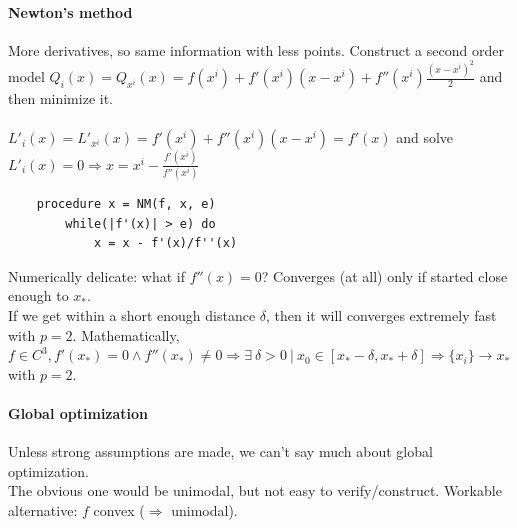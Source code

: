 \documentclass[10pt]{report}
\begin{document}
\paragraph{Newton's method} More derivatives, so same information with less points. Construct a second order model $Q_i(x) = Q_{x^i}(x) = f(x^i) + f'(x^i)(x - x^i) + f''(x^i)\frac{(x - x^i)^2}{2}$ and then minimize it.\\\\
$L'_i(x) = L'_{x^i}(x) = f'(x^i) + f''(x^i)(x - x^i) = f'(x)$ and solve $L'_i(x) = 0 \Rightarrow x = x^i - \frac{f'(x^i)}{f''(x^i)}$
\begin{verbatim}
	procedure x = NM(f, x, e)
		while(|f'(x)| > e) do
			x = x - f'(x)/f''(x)
\end{verbatim}
Numerically delicate: what if $f''(x) = 0$? Converges (at all) only if started close enough to $x_*$.\\
If we get within a short enough distance $\delta$, then it will converges extremely fast with $p = 2$. Mathematically, $f\in C^3, f'(x_*) = 0 \wedge f''(x_*)\neq 0\Rightarrow \exists\:\delta>0\:|\:x_0\in[x_*-\delta, x_*+\delta]\Rightarrow \{x_i\} \rightarrow x_*$ with $p = 2$.

\paragraph{Global optimization} Unless strong assumptions are made, we can't say much about global optimization.\\
The obvious one would be unimodal, but not easy to verify/construct. Workable alternative: $f$ convex ($\Rightarrow$ unimodal).
\end{document}
